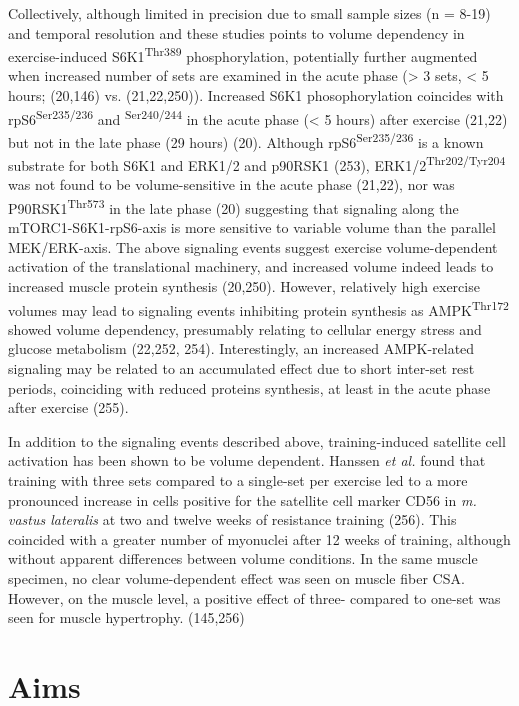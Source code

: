 \documentclass[twoside,10pt]{gihclass} %
\begin{document}
Collectively, although limited in precision due to small sample sizes (n = 8-19) and temporal resolution and
these studies points to volume dependency in exercise-induced S6K1\textsuperscript{Thr389} phosphorylation, potentially further augmented when increased number of sets are examined in the acute phase
(\textgreater{} 3 sets, \textless{} 5 hours; (20,146) vs. (21,22,250)).
Increased S6K1 phosophorylation coincides with rpS6\textsuperscript{Ser235/236} and \textsuperscript{Ser240/244} in the acute phase (\textless{} 5 hours) after exercise
(21,22) but not in the late phase (29 hours) (20).
Although rpS6\textsuperscript{Ser235/236} is a known substrate for both S6K1 and ERK1/2 and p90RSK1
(253),
ERK1/2\textsuperscript{Thr202/Tyr204} was not found to be volume-sensitive in the acute phase
(21,22),
nor was P90RSK1\textsuperscript{Thr573} in the late phase (20)
suggesting that signaling along the mTORC1-S6K1-rpS6-axis is more sensitive to variable volume than the parallel MEK/ERK-axis.
The above signaling events suggest exercise volume-dependent activation of the translational machinery, and increased volume indeed leads to increased muscle protein synthesis
(20,250).
However, relatively high exercise volumes may lead to signaling events inhibiting protein synthesis as AMPK\textsuperscript{Thr172} showed volume dependency, presumably relating to cellular energy stress and glucose metabolism
(22,252, 254).
Interestingly, an increased AMPK-related signaling may be related to an accumulated effect due to short inter-set rest periods, coinciding with reduced proteins synthesis, at least in the acute phase after exercise
(255).

In addition to the signaling events described above, training-induced satellite cell activation has been shown to be volume dependent.
Hanssen \emph{et al.} found that training with three sets compared to a single-set per exercise led to a more pronounced increase in cells positive for the satellite cell marker CD56 in \emph{m. vastus lateralis} at two and twelve weeks of resistance training (256).
This coincided with a greater number of myonuclei after 12 weeks of training, although without apparent differences between volume conditions.
In the same muscle specimen, no clear volume-dependent effect was seen on muscle fiber CSA. However, on the muscle level, a positive effect of three- compared to one-set was seen for muscle hypertrophy.
(145,256)

\hypertarget{aims}{%
\chapter{Aims}\label{aims}}
\end{document}
